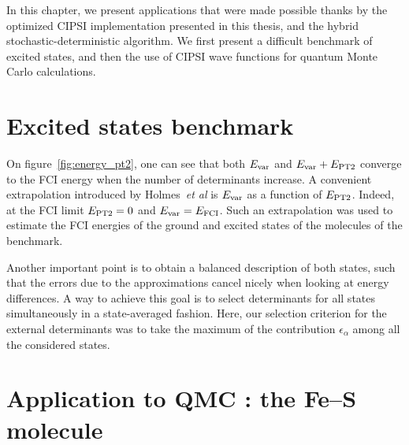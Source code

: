 \documentclass[./thesis.tex]{subfiles}
\begin{document}
\label{chap:applications}

In this chapter, we present applications that were made possible thanks by
the optimized CIPSI implementation presented in this thesis, and the hybrid
stochastic-deterministic algorithm. 
We first present a difficult benchmark of excited states, and then the use
of CIPSI wave functions for quantum Monte Carlo calculations.

\section{Excited states benchmark}

On figure~\ref{fig:energy_pt2}, one can see that both $E_\text{var}$ and $E_\text{var}+E_\text{PT2}$
converge to the FCI energy when the number of determinants increase. A
convenient extrapolation introduced by Holmes~\textit{et al} is $E_\text{var}$ as a
function of $E_\text{PT2}$. Indeed, at the FCI limit $E_\text{PT2}=0$ and $E_\text{var}=E_\text{FCI}$.  Such
an extrapolation was used to estimate the FCI energies of the ground and
excited states of the molecules of the benchmark.

Another important point is to obtain a balanced description of both states,
such that the errors due to the approximations cancel nicely when looking at
energy differences. A way to achieve this goal is to select determinants for all
states simultaneously in a state-averaged fashion. Here, our selection criterion
for the external determinants was to take the maximum of the contribution
$\epsilon_\alpha$ among all the considered states.



\section{Application to QMC : the Fe--S molecule}
\end{document}
